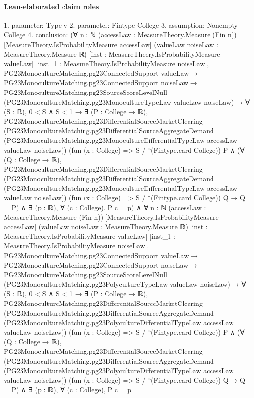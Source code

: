 \documentclass[10pt]{article}
\begin{document}
\paragraph{Lean-elaborated claim roles}\begin{ReviewVerbatim}
1. parameter: Type v
2. parameter: Fintype College
3. assumption: Nonempty College
4. conclusion: (∀ {n : ℕ} (accessLaw : MeasureTheory.Measure (Fin n)) [MeasureTheory.IsProbabilityMeasure accessLaw]
    (valueLaw noiseLaw : MeasureTheory.Measure ℝ) [inst : MeasureTheory.IsProbabilityMeasure valueLaw]
    [inst_1 : MeasureTheory.IsProbabilityMeasure noiseLaw],
    PG23MonocultureMatching.pg23ConnectedSupport valueLaw →
      PG23MonocultureMatching.pg23ConnectedSupport noiseLaw →
        PG23MonocultureMatching.pg23SourceScoreLevelNull
            (PG23MonocultureMatching.pg23MonocultureTypeLaw valueLaw noiseLaw) →
          ∀ (S : ℝ),
            0 < S ∧ S < 1 →
              ∃ (P : College → ℝ),
                PG23MonocultureMatching.pg23DifferentialSourceMarketClearing
                    (PG23MonocultureMatching.pg23DifferentialSourceAggregateDemand
                      (PG23MonocultureMatching.pg23MonocultureDifferentialTypeLaw accessLaw valueLaw noiseLaw))
                    (fun (x : College) => S / ↑(Fintype.card College)) P ∧
                  (∀ (Q : College → ℝ),
                      PG23MonocultureMatching.pg23DifferentialSourceMarketClearing
                          (PG23MonocultureMatching.pg23DifferentialSourceAggregateDemand
                            (PG23MonocultureMatching.pg23MonocultureDifferentialTypeLaw accessLaw valueLaw noiseLaw))
                          (fun (x : College) => S / ↑(Fintype.card College)) Q →
                        Q = P) ∧
                    ∃ (p : ℝ), ∀ (c : College), P c = p) ∧
  ∀ {n : ℕ} (accessLaw : MeasureTheory.Measure (Fin n)) [MeasureTheory.IsProbabilityMeasure accessLaw]
    (valueLaw noiseLaw : MeasureTheory.Measure ℝ) [inst : MeasureTheory.IsProbabilityMeasure valueLaw]
    [inst_1 : MeasureTheory.IsProbabilityMeasure noiseLaw],
    PG23MonocultureMatching.pg23ConnectedSupport valueLaw →
      PG23MonocultureMatching.pg23ConnectedSupport noiseLaw →
        PG23MonocultureMatching.pg23SourceScoreLevelNull
            (PG23MonocultureMatching.pg23PolycultureTypeLaw valueLaw noiseLaw) →
          ∀ (S : ℝ),
            0 < S ∧ S < 1 →
              ∃ (P : College → ℝ),
                PG23MonocultureMatching.pg23DifferentialSourceMarketClearing
                    (PG23MonocultureMatching.pg23DifferentialSourceAggregateDemand
                      (PG23MonocultureMatching.pg23PolycultureDifferentialTypeLaw accessLaw valueLaw noiseLaw))
                    (fun (x : College) => S / ↑(Fintype.card College)) P ∧
                  (∀ (Q : College → ℝ),
                      PG23MonocultureMatching.pg23DifferentialSourceMarketClearing
                          (PG23MonocultureMatching.pg23DifferentialSourceAggregateDemand
                            (PG23MonocultureMatching.pg23PolycultureDifferentialTypeLaw accessLaw valueLaw noiseLaw))
                          (fun (x : College) => S / ↑(Fintype.card College)) Q →
                        Q = P) ∧
                    ∃ (p : ℝ), ∀ (c : College), P c = p
\end{ReviewVerbatim}
\end{document}
